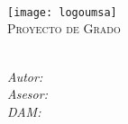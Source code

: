 \begin{titlepage}
	\begin{center}		
		\textsc{\LARGE {\myUniversity}}\\[0.5cm] 
		\textsc{\Large{\myFaculty}}\\[0.5cm]
		\textsc{\large{\myDepartment}}\\[1cm]
		\texttt{[image: logoumsa]}\\[1cm] 
		\textsc{\LARGE Proyecto de Grado}\\[1.5cm]			
		\textsc{\Large \myTitle}\\[2cm]									
		\begin{minipage}{0.8\textwidth}
			\begin{flushleft} 
				\large\textit{Autor:}\quad\myAuthorName\\[0.5cm]
				\large\textit{Asesor:}\quad\myAsesorName\\[0.5cm]
				\large\textit{DAM:}\quad\ \mySupervisorName\\[0.5cm]
			\end{flushleft}
		\end{minipage}\\[2cm]		
		\the\year	
		\vfill
	\end{center}	
\end{titlepage}
